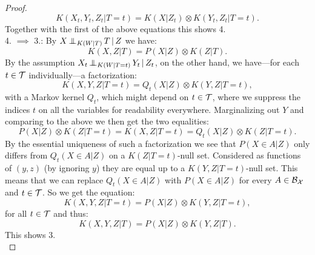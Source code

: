 \begin{Thm}
\begin{proof}
    \[K(X_t,Y_t,Z_t|T=t) = K(X|Z_t) \otimes K(Y_t,Z_t|T=t). \]
    Together with the first of the above equations this shows 4.\\
    4. $\implies$ 3.: By $X \operatorname*{\perp\mkern-11mu\perp}_{K(W|T)} T \operatorname*{|} Z$ we have:
    \[K(X,Z|T) = P(X|Z) \otimes K(Z|T).\]
    By the assumption $ X_t \operatorname*{\perp\mkern-11mu\perp}_{K(W|T=t)} Y_t \operatorname*{|} Z_t$, on the other hand, we have---for each $t \in \mathcal{T}$ individually---a factorization:
    \[ K(X,Y,Z|T=t) = Q_t(X|Z) \otimes K(Y,Z|T=t),  \]
    with a Markov kernel $Q_t$, which might depend on $t \in \mathcal{T}$, where we suppress the indices $t$ on all the variables for readability everywhere.
Marginalizing out $Y$ and comparing to the above we then get the two equalities:
\[ P(X|Z) \otimes K(Z|T=t) = K(X,Z|T=t)  = Q_t(X|Z) \otimes K(Z|T=t).\]
By the essential uniqueness of such a factorization we see that $P(X \in A|Z)$ only differs from $Q_t(X \in A|Z)$ on a $K(Z|T=t)$-null set. Considered as functions of $(y,z)$ (by ignoring $y$) they are equal up to a $K(Y,Z|T=t)$-null set. This means that we can replace $Q_t(X \in A|Z)$ with $P(X\in A|Z)$ for every $A \in \mathcal{B}_{\mathcal{X}}$ and $t \in \mathcal{T}$. So we get the equation:
        \[ K(X,Y,Z|T=t) = P(X|Z) \otimes K(Y,Z|T=t),  \]
        for all $t \in \mathcal{T}$ and thus:
  \[ K(X,Y,Z|T) = P(X|Z) \otimes K(Y,Z|T).  \]
  This shows 3.\\ 

\end{proof}
\end{Thm}
